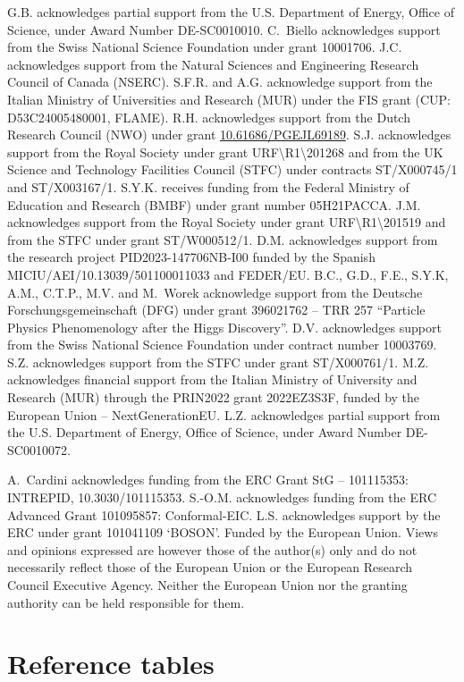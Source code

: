 \documentclass{SciPost_better_arXiv}
\begin{document}
G.B. acknowledges partial support from the U.S. Department of Energy, Office of
Science, under Award Number DE-SC0010010.
C.~Biello acknowledges support from the Swiss National Science Foundation under
grant 10001706.
J.C. acknowledges support from the Natural Sciences and Engineering Research
Council of Canada (NSERC).
S.F.R. and A.G. acknowledge support from the Italian Ministry of Universities
and Research (MUR) under the FIS grant (CUP: D53C24005480001, FLAME).
R.H. acknowledges support from the Dutch Research Council (NWO) under grant
\href{https://doi.org/10.61686/PGEJL69189}{10.61686/PGEJL69189}.
S.J. acknowledges support from the Royal Society under grant URF{\textbackslash}R1{\textbackslash}201268
and from the UK Science and Technology Facilities Council (STFC) under contracts
ST/X000745/1 and ST/X003167/1.
S.Y.K. receives funding from the Federal Ministry of Education and Research
(BMBF) under grant number 05H21PACCA.
J.M. acknowledges support from the Royal Society under grant
URF{\textbackslash}R1{\textbackslash}201519 and from the STFC under grant ST/W000512/1.
D.M. acknowledges support from the research project PID2023-147706NB-I00
funded by the Spanish MICIU/AEI/10.13039/501100011033 and FEDER/EU.
B.C., G.D., F.E., S.Y.K, A.M., C.T.P., M.V. and M.~Worek acknowledge support from the Deutsche Forschungsgemeinschaft
(DFG) under grant 396021762 -- TRR 257 ``Particle Physics Phenomenology after the
Higgs Discovery''.
D.V. acknowledges support from the Swiss National Science Foundation under
contract number 10003769.
S.Z. acknowledges support from the STFC under grant ST/X000761/1.
M.Z. acknowledges financial support from the Italian Ministry of University and
Research (MUR) through the PRIN2022 grant 2022EZ3S3F, funded by the European
Union -- NextGenerationEU.
L.Z. acknowledges partial support from the U.S. Department of Energy, Office of
Science, under Award Number DE-SC0010072.

A.~Cardini acknowledges funding from the ERC Grant StG -- 101115353: INTREPID,
10.3030/101115353.
S.-O.M. acknowledges funding from the ERC Advanced Grant 101095857:
Conformal-EIC.
L.S. acknowledges support by the ERC under grant 101041109 `BOSON'.
Funded by the European Union. Views and opinions expressed are however those of
the author(s) only and do not necessarily reflect those of the European Union or
the European Research Council Executive Agency. Neither the European Union nor
the granting authority can be held responsible for them.
\newpage
\appendix
\section{Reference tables}
\label{app:tables}

\clearpage
\end{document}
